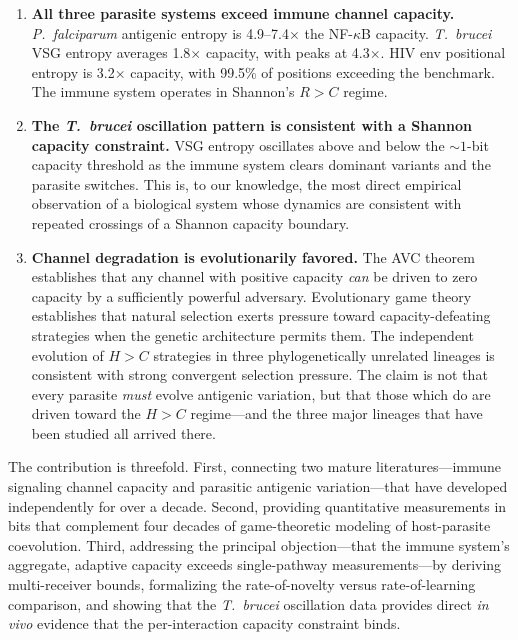 \documentclass[twocolumn,10pt]{article}
\begin{document}
\begin{enumerate}
\item \textbf{All three parasite systems exceed immune channel capacity.}  \textit{P.~falciparum} antigenic entropy is 4.9--7.4$\times$ the NF-$\kappa$B capacity.  \textit{T.~brucei} VSG entropy averages 1.8$\times$ capacity, with peaks at 4.3$\times$.  HIV env positional entropy is 3.2$\times$ capacity, with 99.5\% of positions exceeding the benchmark.  The immune system operates in Shannon's $R > C$ regime.

\item \textbf{The \textit{T.~brucei} oscillation pattern is consistent with a Shannon capacity constraint.}  VSG entropy oscillates above and below the ${\sim}1$-bit capacity threshold as the immune system clears dominant variants and the parasite switches.  This is, to our knowledge, the most direct empirical observation of a biological system whose dynamics are consistent with repeated crossings of a Shannon capacity boundary.

\item \textbf{Channel degradation is evolutionarily favored.}  The AVC theorem establishes that any channel with positive capacity \emph{can} be driven to zero capacity by a sufficiently powerful adversary.  Evolutionary game theory establishes that natural selection exerts pressure toward capacity-defeating strategies when the genetic architecture permits them.  The independent evolution of $H > C$ strategies in three phylogenetically unrelated lineages is consistent with strong convergent selection pressure.  The claim is not that every parasite \emph{must} evolve antigenic variation, but that those which do are driven toward the $H > C$ regime---and the three major lineages that have been studied all arrived there.
\end{enumerate}

The contribution is threefold.  First, connecting two mature literatures---immune signaling channel capacity and parasitic antigenic variation---that have developed independently for over a decade.  Second, providing quantitative measurements in bits that complement four decades of game-theoretic modeling of host-parasite coevolution.  Third, addressing the principal objection---that the immune system's aggregate, adaptive capacity exceeds single-pathway measurements---by deriving multi-receiver bounds, formalizing the rate-of-novelty versus rate-of-learning comparison, and showing that the \textit{T.~brucei} oscillation data provides direct \emph{in vivo} evidence that the per-interaction capacity constraint binds.
\end{document}
